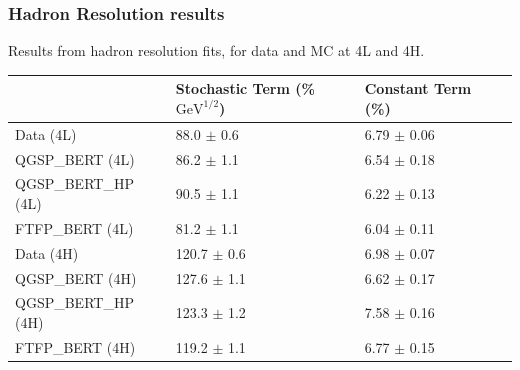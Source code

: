 \documentclass[10pt]{beamer}
\begin{document}
\begin{frame}\frametitle{Hadron Resolution results}
Results from hadron resolution fits, for data and MC at 4L and 4H.
{\footnotesize
\begin{tabular}{|l|l|l|l|}
\hline
& Stochastic Term (\% $\mathrm{GeV}^{1/2}$) & Constant Term (\%) \\
\hline
Data (4L) & 88.0 $\pm$ 0.6 & 6.79 $\pm$ 0.06\\
QGSP\_BERT (4L) & 86.2 $\pm$ 1.1 & 6.54 $\pm$ 0.18\\
QGSP\_BERT\_HP (4L) & 90.5 $\pm$ 1.1 & 6.22 $\pm$ 0.13\\
FTFP\_BERT (4L) & 81.2 $\pm$ 1.1 & 6.04 $\pm$ 0.11\\
Data (4H) & 120.7 $\pm$ 0.6 & 6.98 $\pm$ 0.07\\
QGSP\_BERT (4H) & 127.6 $\pm$ 1.1 & 6.62 $\pm$ 0.17\\
QGSP\_BERT\_HP (4H) & 123.3 $\pm$ 1.2 & 7.58 $\pm$ 0.16\\
FTFP\_BERT (4H) & 119.2 $\pm$ 1.1 & 6.77 $\pm$ 0.15\\
\hline
\end{tabular}
}
\end{frame}
\end{document}
